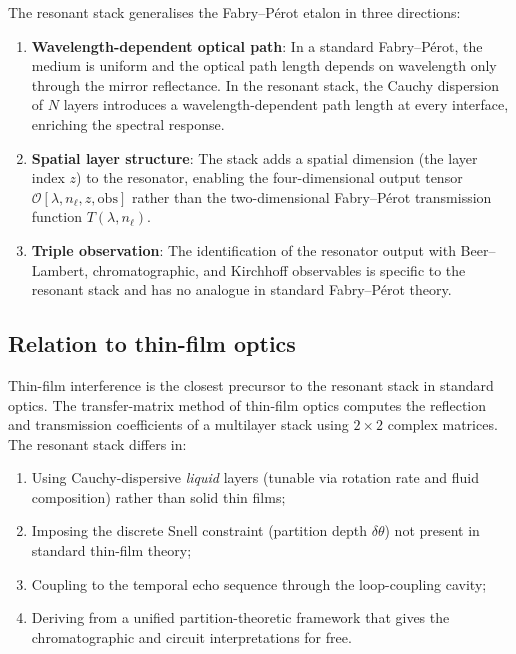 \documentclass[11pt,twocolumn,a4paper]{article}
\theoremstyle{plain}
\theoremstyle{definition}
\theoremstyle{remark}
\begin{document}
The resonant stack generalises the Fabry--P\'{e}rot etalon \cite{Fabry1899,FabryPerot1899} in three directions:
\begin{enumerate}[noitemsep]
  \item \textbf{Wavelength-dependent optical path}: In a standard Fabry--P\'{e}rot, the medium is uniform and the optical path length depends on wavelength only through the mirror reflectance. In the resonant stack, the Cauchy dispersion of $N$ layers introduces a wavelength-dependent path length at every interface, enriching the spectral response.
  \item \textbf{Spatial layer structure}: The stack adds a spatial dimension (the layer index $z$) to the resonator, enabling the four-dimensional output tensor $\mathcal{O}[\lambda,n_\ell,z,\text{obs}]$ rather than the two-dimensional Fabry--P\'{e}rot transmission function $T(\lambda,n_\ell)$.
  \item \textbf{Triple observation}: The identification of the resonator output with Beer--Lambert, chromatographic, and Kirchhoff observables is specific to the resonant stack and has no analogue in standard Fabry--P\'{e}rot theory.
\end{enumerate}

\subsection{Relation to thin-film optics}

Thin-film interference \cite{Macleod2001,Heavens1955} is the closest precursor to the resonant stack in standard optics. The transfer-matrix method of thin-film optics \cite{BornWolf1999} computes the reflection and transmission coefficients of a multilayer stack using $2\times 2$ complex matrices. The resonant stack differs in:
\begin{enumerate}[noitemsep]
  \item Using Cauchy-dispersive \emph{liquid} layers (tunable via rotation rate and fluid composition) rather than solid thin films;
  \item Imposing the discrete Snell constraint (partition depth $\delta\theta$) not present in standard thin-film theory;
  \item Coupling to the temporal echo sequence through the loop-coupling cavity;
  \item Deriving from a unified partition-theoretic framework that gives the chromatographic and circuit interpretations for free.
\end{enumerate}
\end{document}
